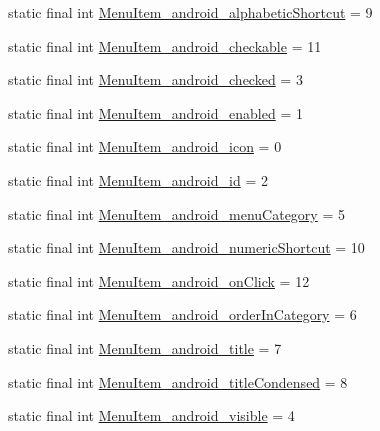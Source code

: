 \begin{DoxyCompactItemize}
\item 
static final int \hyperlink{classproject4_1_1xaria_1_1R_1_1styleable_aeb141859a1dafcfccfcc8935ac95cc18}{Menu\+Item\+\_\+android\+\_\+alphabetic\+Shortcut} = 9
\item 
static final int \hyperlink{classproject4_1_1xaria_1_1R_1_1styleable_a6db17e4fd6d4d5c9afd707369ba1b57e}{Menu\+Item\+\_\+android\+\_\+checkable} = 11
\item 
static final int \hyperlink{classproject4_1_1xaria_1_1R_1_1styleable_aab5272133c6c4ac6e0192fd2732a95b7}{Menu\+Item\+\_\+android\+\_\+checked} = 3
\item 
static final int \hyperlink{classproject4_1_1xaria_1_1R_1_1styleable_a020dd31aa0835cbf2154f437b30f8112}{Menu\+Item\+\_\+android\+\_\+enabled} = 1
\item 
static final int \hyperlink{classproject4_1_1xaria_1_1R_1_1styleable_a628a1007379fdf99ddcec87c55a86e35}{Menu\+Item\+\_\+android\+\_\+icon} = 0
\item 
static final int \hyperlink{classproject4_1_1xaria_1_1R_1_1styleable_ab6868d10b29e450bcfb02c2f597a71b6}{Menu\+Item\+\_\+android\+\_\+id} = 2
\item 
static final int \hyperlink{classproject4_1_1xaria_1_1R_1_1styleable_af46cfe726f92832e0764981044beda57}{Menu\+Item\+\_\+android\+\_\+menu\+Category} = 5
\item 
static final int \hyperlink{classproject4_1_1xaria_1_1R_1_1styleable_ae2e9861ee0e27e73ac735e1186c10eba}{Menu\+Item\+\_\+android\+\_\+numeric\+Shortcut} = 10
\item 
static final int \hyperlink{classproject4_1_1xaria_1_1R_1_1styleable_ae290bec2869c281c693e4b84883cb6b9}{Menu\+Item\+\_\+android\+\_\+on\+Click} = 12
\item 
static final int \hyperlink{classproject4_1_1xaria_1_1R_1_1styleable_ae2a0816c4c9b67480600cac4a4fc9282}{Menu\+Item\+\_\+android\+\_\+order\+In\+Category} = 6
\item 
static final int \hyperlink{classproject4_1_1xaria_1_1R_1_1styleable_a386f2f1153e5a68c43202e15a0d95317}{Menu\+Item\+\_\+android\+\_\+title} = 7
\item 
static final int \hyperlink{classproject4_1_1xaria_1_1R_1_1styleable_af594043a31da455b0789db1f3a3fbef2}{Menu\+Item\+\_\+android\+\_\+title\+Condensed} = 8
\item 
static final int \hyperlink{classproject4_1_1xaria_1_1R_1_1styleable_af028a1cfa670b4bc1eae5a3ccd4db34e}{Menu\+Item\+\_\+android\+\_\+visible} = 4
\item 

\end{DoxyCompactItemize}
